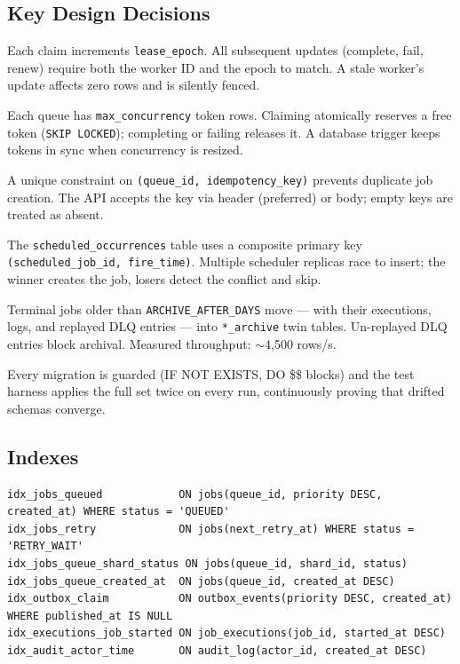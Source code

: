 \documentclass[11pt,a4paper]{article}
\begin{document}
\subsection{Key Design Decisions}

\begin{description}[style=nextline]
\item[Lease Epoch Fencing] Each claim increments \texttt{lease\_epoch}. All
subsequent updates (complete, fail, renew) require both the worker ID and the
epoch to match. A stale worker's update affects zero rows and is silently
fenced.
\item[Capacity Tokens] Each queue has \texttt{max\_concurrency} token rows.
Claiming atomically reserves a free token (\texttt{SKIP LOCKED}); completing
or failing releases it. A database trigger keeps tokens in sync when
concurrency is resized.
\item[Idempotency] A unique constraint on \texttt{(queue\_id,
idempotency\_key)} prevents duplicate job creation. The API accepts the key
via header (preferred) or body; empty keys are treated as absent.
\item[Cron Deduplication] The \texttt{scheduled\_occurrences} table uses a
composite primary key \texttt{(scheduled\_job\_id, fire\_time)}. Multiple
scheduler replicas race to insert; the winner creates the job, losers detect
the conflict and skip.
\item[Hot/Cold Separation] Terminal jobs older than \texttt{ARCHIVE\_AFTER\_DAYS}
move — with their executions, logs, and replayed DLQ entries — into
\texttt{*\_archive} twin tables. Un-replayed DLQ entries block archival.
Measured throughput: $\sim$4{,}500 rows/s.
\item[Migration Idempotency] Every migration is guarded (IF NOT EXISTS, DO
\$\$ blocks) and the test harness applies the full set twice on every run,
continuously proving that drifted schemas converge.
\end{description}

\subsection{Indexes}

\begin{lstlisting}
idx_jobs_queued            ON jobs(queue_id, priority DESC, created_at) WHERE status = 'QUEUED'
idx_jobs_retry             ON jobs(next_retry_at) WHERE status = 'RETRY_WAIT'
idx_jobs_queue_shard_status ON jobs(queue_id, shard_id, status)
idx_jobs_queue_created_at  ON jobs(queue_id, created_at DESC)
idx_outbox_claim           ON outbox_events(priority DESC, created_at) WHERE published_at IS NULL
idx_executions_job_started ON job_executions(job_id, started_at DESC)
idx_audit_actor_time       ON audit_log(actor_id, created_at DESC)
\end{lstlisting}
\end{document}
